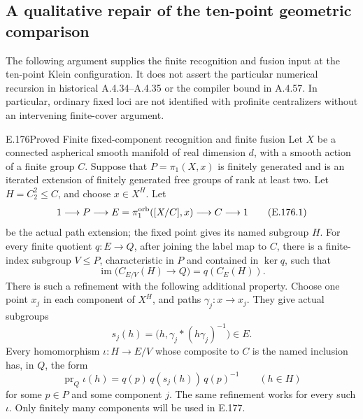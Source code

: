 \subsection{A qualitative repair of the ten-point geometric comparison}

The following argument supplies the finite recognition and fusion
input at the ten-point Klein configuration.  It does not assert the
particular numerical recursion in historical A.4.34--A.4.35 or the
compiler bound in A.4.57.  In particular, ordinary fixed loci are
not identified with profinite centralizers without an intervening
finite-cover argument.

\begin{result}{E.176}{Proved}
{Finite fixed-component recognition and finite fusion}
Let \(X\) be a connected aspherical smooth manifold of real
dimension \(d\), with a smooth action of a finite group \(C\).
Suppose that \(P=\pi_1(X,x)\) is finitely generated and is an
iterated extension of finitely generated free groups of rank at
least two.  Let \(H=C_2^2\leq C\), and choose \(x\in X^H\).
Let
\[
 1\longrightarrow P\longrightarrow E
   =\pi_1^{\rm orb}([X/C],x)\longrightarrow C\longrightarrow1
\tag{E.176.1}
\]
be the actual path extension; the fixed point gives its named
subgroup \(H\).
For every finite quotient \(q:E\to Q\), after joining the label
map to \(C\), there is a finite-index subgroup \(V\leq P\),
characteristic in \(P\) and contained in \(\ker q\), such that
\[
 \operatorname{im}\bigl(C_{E/V}(H)\longrightarrow Q\bigr)
                       =q(C_E(H)).
\tag{E.176.2}
\]
There is such a refinement with the following additional
property.  Choose one point \(x_j\) in each component of \(X^H\),
and paths \(\gamma_j:x\to x_j\).  They give actual subgroups
\[
 s_j(h)=\bigl(h,\gamma_j*(h\gamma_j)^{-1}\bigr)\in E.
\tag{E.176.3}
\]
Every homomorphism \(\iota:H\to E/V\) whose composite to \(C\)
is the named inclusion has, in \(Q\), the form
\[
             \operatorname{pr}_Q\iota(h)
                       =q(p)\,q(s_j(h))\,q(p)^{-1}
              \qquad(h\in H)
\tag{E.176.4}
\]
for some \(p\in P\) and some component \(j\).
The same refinement works for every such \(\iota\).
Only finitely many components will be used in E.177.
\end{result}


